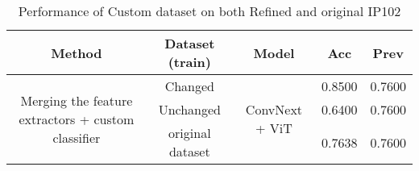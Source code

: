 \begin{table}[!htbp]
\centering
\begin{tabular}{|c|c|c|c|c|}
\hline
\textbf{Method} & \textbf{Dataset (train)} & \textbf{Model} & \textbf{Acc} & \textbf{Prev}\\
\hline
\multirow{3}{10em}{Merging the feature extractors + custom classifier} & Changed & \multirow{3}{5em}{ConvNext + ViT} & 0.8500 & 0.7600 \\\cline{2-2}\cline{4-5}
& Unchanged & & 0.6400 & 0.7600\\\cline{2-2}\cline{4-5}
& original dataset & & 0.7638 & 0.7600\\\cline{2-2}\cline{4-5}
\hline
\end{tabular}
\caption{Performance of Custom dataset on both Refined and original IP102}
\end{table}